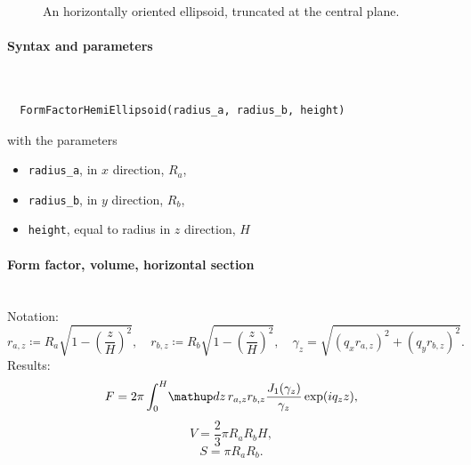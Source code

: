 \begin{figure}[H]
\hfill
{}
\hfill
{}
\hfill
{}
\hfill
\caption{An horizontally oriented ellipsoid, truncated at the central plane.}
\end{figure}

\paragraph{Syntax and parameters}\strut\\[-2ex plus .2ex minus .2ex]
\begin{lstlisting}
  FormFactorHemiEllipsoid(radius_a, radius_b, height)
\end{lstlisting}
with the parameters
\begin{itemize}
\item \texttt{radius\_a}, in $x$ direction, $R_a$,
\item \texttt{radius\_b}, in $y$ direction, $R_b$,
\item \texttt{height}, equal to radius in $z$ direction, $H$
\end{itemize}

\paragraph{Form factor, volume, horizontal section}\strut\\
Notation:
\begin{equation*}
 r_{a,z} \coloneqq R_a \sqrt{1-\left(\dfrac{z}{H} \right)^2},\quad
 r_{b,z} \coloneqq R_b \sqrt{1-\left(\dfrac{z}{H} \right)^2}, \quad
 \gamma_z =\sqrt{(q_x r_{a,z})^2+(q_y r_{b,z})^2}.
\end{equation*}
Results:
\begin{equation*}
  F = 2\pi \int_0^{H} \!\d z\, r_{a,z} r_{b,z}
                               \frac{J_1(\gamma_z)}{\gamma_z}\exp(iq_z z),
\end{equation*}
\begin{equation*}
  V = \dfrac{2}{3}\pi R_a R_bH,
\end{equation*}
\begin{equation*}
  S =\pi R_a R_b.
\end{equation*}

